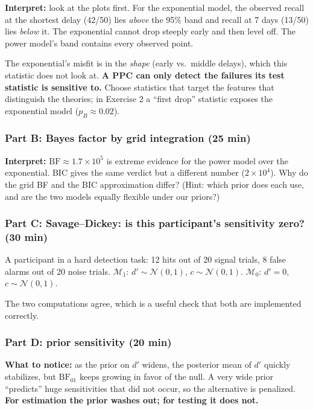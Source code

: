 \textbf{Interpret:} look at the plots first. For the exponential model,
the observed recall at the shortest delay (42/50) lies \emph{above} the
95\% band and recall at 7 days (13/50) lies \emph{below} it. The
exponential cannot drop steeply early and then level off. The power
model's band contains every observed point.

The exponential's misfit is in the \emph{shape} (early vs.~middle
delays), which this statistic does not look at. \textbf{A PPC can only
detect the failures its test statistic is sensitive to.} Choose
statistics that target the features that distinguish the theories; in
Exercise 2 a ``first drop'' statistic exposes the exponential model
(\(p_B \approx 0.02\)).

\subsubsection{Part B: Bayes factor by grid integration (25 min)}

\textbf{Interpret:} \(\mathrm{BF} \approx 1.7 \times 10^5\) is extreme
evidence for the power model over the exponential. BIC gives the same
verdict but a different number (\(2 \times 10^4\)). Why do the grid BF
and the BIC approximation differ? (Hint: which prior does each use, and
are the two models equally flexible under our priors?)

\subsubsection{Part C: Savage--Dickey: is this participant's sensitivity
zero? (30 min)}

A participant in a hard detection task: 12 hits out of 20 signal trials,
8 false alarms out of 20 noise trials. \(\mathcal{M}_1\):
\(d' \sim \mathcal{N}(0, 1)\), \(c \sim \mathcal{N}(0, 1)\).
\(\mathcal{M}_0\): \(d' = 0\), \(c \sim \mathcal{N}(0, 1)\).

The two computations agree, which is a useful check that both are
implemented correctly.

\subsubsection{Part D: prior sensitivity (20 min)}

\textbf{What to notice:} as the prior on \(d'\) widens, the posterior
mean of \(d'\) quickly stabilizes, but \(\mathrm{BF}_{01}\) keeps
growing in favor of the null. A very wide prior ``predicts'' huge
sensitivities that did not occur, so the alternative is penalized.
\textbf{For estimation the prior washes out; for testing it does not.}

